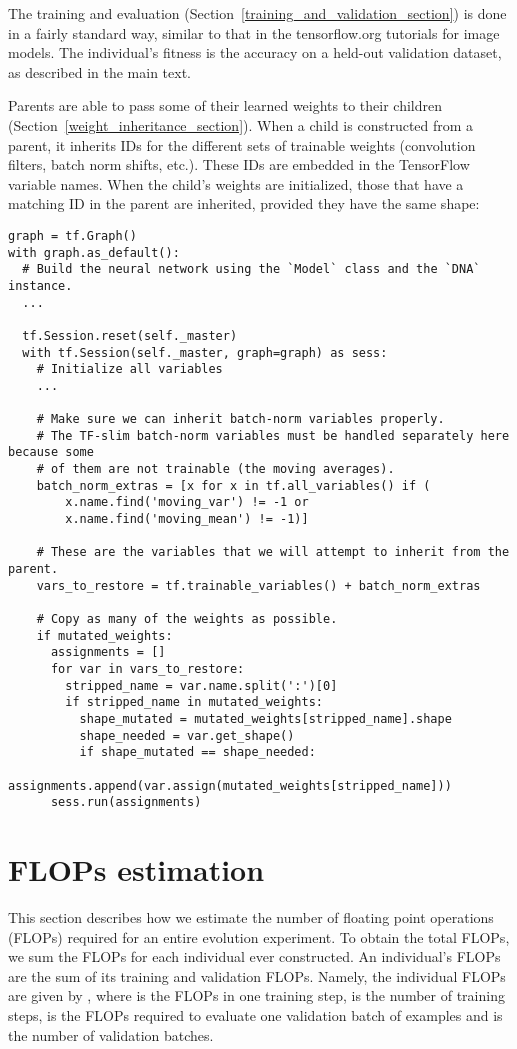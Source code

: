 \documentclass{article}
\begin{document}
The training and evaluation (Section~\ref{training_and_validation_section}) is done in a fairly standard way, similar to that in the tensorflow.org tutorials for image models. The individual's fitness is the accuracy on a held-out validation dataset, as described in the main text.

Parents are able to pass some of their learned weights to their children (Section~\ref{weight_inheritance_section}). When a child is constructed from a parent, it inherits IDs for the different sets of trainable weights (convolution filters, batch norm shifts, etc.). These IDs are embedded in the TensorFlow variable names. When the child's weights are initialized, those that have a matching ID in the parent are inherited, provided they have the same shape:
\smallskip
\begin{lstlisting}
graph = tf.Graph()
with graph.as_default():
  # Build the neural network using the `Model` class and the `DNA` instance.
  ...

  tf.Session.reset(self._master)
  with tf.Session(self._master, graph=graph) as sess:
    # Initialize all variables
    ...

    # Make sure we can inherit batch-norm variables properly.
    # The TF-slim batch-norm variables must be handled separately here because some
    # of them are not trainable (the moving averages).
    batch_norm_extras = [x for x in tf.all_variables() if (
        x.name.find('moving_var') != -1 or
        x.name.find('moving_mean') != -1)]
        
    # These are the variables that we will attempt to inherit from the parent.
    vars_to_restore = tf.trainable_variables() + batch_norm_extras
    
    # Copy as many of the weights as possible.
    if mutated_weights:
      assignments = []
      for var in vars_to_restore:
        stripped_name = var.name.split(':')[0]
        if stripped_name in mutated_weights:
          shape_mutated = mutated_weights[stripped_name].shape
          shape_needed = var.get_shape()
          if shape_mutated == shape_needed:
            assignments.append(var.assign(mutated_weights[stripped_name]))
      sess.run(assignments)
\end{lstlisting}


\section{FLOPs estimation}


This section describes how we estimate the number of floating point operations (FLOPs) required for an entire evolution experiment. To obtain the total FLOPs, we sum the FLOPs for each individual ever constructed. An individual's FLOPs are the sum of its training and validation FLOPs. Namely, the individual FLOPs are given by , where  is the FLOPs in one training step,  is the number of training steps,  is the FLOPs required to evaluate one validation batch of examples and  is the number of validation batches.
\end{document}
